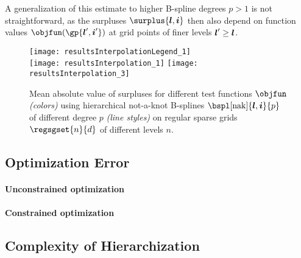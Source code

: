 A generalization of this estimate to higher B-spline degrees $p > 1$
is not straightforward, as the surpluses $\surplus{\*l,\*i}$
then also depend on function values $\objfun(\gp{\*l',\*i'})$ at
grid points of finer levels ${\boldsymbol{l}}' \ge {\boldsymbol{l}}$.

\blindtext{}

\begin{figure}
  \texttt{[image: resultsInterpolationLegend\_1]}\\[2mm]%
  \texttt{[image: resultsInterpolation\_1]}%
  \hfill%
  \texttt{[image: resultsInterpolation\_3]}%
  \caption[Decay of surpluses for different test functions]{%
    Mean absolute value of surpluses
    for different test functions $\objfun$ \emph{(colors)}
    using hierarchical not-a-knot B-splines
    $\bspl[\nak]{\*l,\*i}{p}$ of different degree $p$ \emph{(line styles)} on
    regular sparse grids $\regsgset{n}{d}$ of different levels $n$.%
  }%
  \label{fig:TODO}%
\end{figure}



\subsection{Optimization Error}
\label{sec:542optimization}

\paragraph{Unconstrained optimization}

\blindtext{}

\paragraph{Constrained optimization}

\blindtext{}



\subsection{Complexity of Hierarchization}
\label{sec:543complexity}

\blindtext{}

